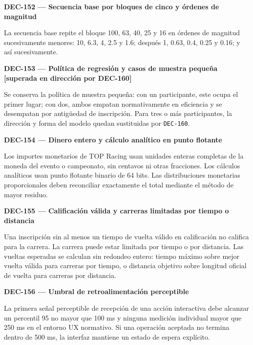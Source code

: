 \documentclass[10pt,letterpaper]{article}
\begin{document}
\noindent\textbf{DEC-152 --- Secuencia base por bloques de cinco y órdenes de magnitud}\par
La secuencia base repite el bloque 100, 63, 40, 25 y 16 en órdenes de magnitud sucesivamente menores: 10, 6.3, 4, 2.5 y 1.6; después 1, 0.63, 0.4, 0.25 y 0.16; y así sucesivamente.\par\vspace{0.45em}
\noindent\textbf{DEC-153 --- Política de regresión y casos de muestra pequeña [superada en dirección por DEC-160]}\par
Se conserva la política de muestra pequeña: con un participante, este ocupa el primer lugar; con dos, ambos empatan normativamente en eficiencia y se desempatan por antigüedad de inscripción. Para tres o más participantes, la dirección y forma del modelo quedan sustituidas por \texttt{DEC-160}.\par\vspace{0.45em}
\noindent\textbf{DEC-154 --- Dinero entero y cálculo analítico en punto flotante}\par
Los importes monetarios de TOP Racing usan unidades enteras completas de la moneda del evento o campeonato, sin centavos ni otras fracciones. Los cálculos analíticos usan punto flotante binario de 64 bits. Las distribuciones monetarias proporcionales deben reconciliar exactamente el total mediante el método de mayor residuo.\par\vspace{0.45em}
\noindent\textbf{DEC-155 --- Calificación válida y carreras limitadas por tiempo o distancia}\par
Una inscripción sin al menos un tiempo de vuelta válido en calificación no califica para la carrera. La carrera puede estar limitada por tiempo o por distancia. Las vueltas esperadas se calculan sin redondeo entero: tiempo máximo sobre mejor vuelta válida para carreras por tiempo, o distancia objetivo sobre longitud oficial de vuelta para carreras por distancia.\par\vspace{0.45em}
\noindent\textbf{DEC-156 --- Umbral de retroalimentación perceptible}\par
La primera señal perceptible de recepción de una acción interactiva debe alcanzar un percentil 95 no mayor que 100 ms y ninguna medición individual mayor que 250 ms en el entorno UX normativo. Si una operación aceptada no termina dentro de 500 ms, la interfaz mantiene un estado de espera explícito.\par\vspace{0.45em}
\end{document}
